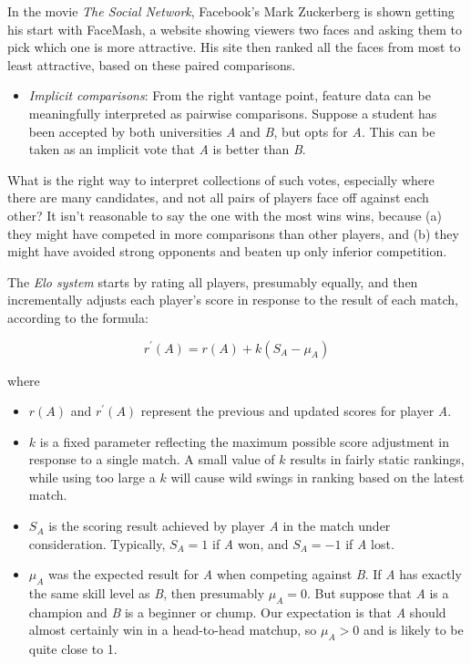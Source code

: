 \documentclass[10pt]{article}
\begin{document}
In the movie \textit{The Social Network}, Facebook’s Mark Zuckerberg is shown getting his start with FaceMash, a website showing viewers two faces and asking them to pick which one is more attractive. His site then ranked all the faces from most to least attractive, based on these paired comparisons.

\begin{itemize}
    \item \textit{Implicit comparisons}: From the right vantage point, feature data can be meaningfully interpreted as pairwise comparisons. Suppose a student has been accepted by both universities \textit{A} and \textit{B}, but opts for \textit{A}. This can be taken as an implicit vote that \textit{A} is better than \textit{B}.
\end{itemize}

What is the right way to interpret collections of such votes, especially where there are many candidates, and not all pairs of players face off against each other? It isn’t reasonable to say the one with the most wins wins, because (a) they might have competed in more comparisons than other players, and (b) they might have avoided strong opponents and beaten up only inferior competition.

The \textit{Elo system} starts by rating all players, presumably equally, and then incrementally adjusts each player’s score in response to the result of each match, according to the formula:

$$
r^{\prime}(A) = r(A) + k(S_A - \mu_A)
$$

where

\begin{itemize}
    \item \(r(A)\) and \(r^{\prime}(A)\) represent the previous and updated scores for player \textit{A}.
    \item \(k\) is a fixed parameter reflecting the maximum possible score adjustment in response to a single match. A small value of \(k\) results in fairly static rankings, while using too large a \(k\) will cause wild swings in ranking based on the latest match.
    \item \(S_A\) is the scoring result achieved by player \textit{A} in the match under consideration. Typically, \(S_A = 1\) if \textit{A} won, and \(S_A = -1\) if \textit{A} lost.
    \item \(\mu_A\) was the expected result for \textit{A} when competing against \textit{B}. If \textit{A} has exactly the same skill level as \textit{B}, then presumably \(\mu_A = 0\). But suppose that \textit{A} is a champion and \textit{B} is a beginner or chump. Our expectation is that \textit{A} should almost certainly win in a head-to-head matchup, so \(\mu_A > 0\) and is likely to be quite close to 1.
\end{itemize}
\end{document}

